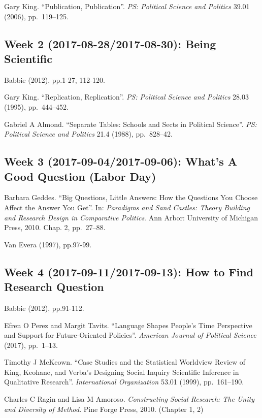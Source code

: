 \documentclass[11pt,]{article}
\theoremstyle{definition}
\theoremstyle{definition}
\theoremstyle{remark}
\begin{document}
Gary King. ``Publication, Publication''.
\emph{PS: Political Science and Politics} 39.01 (2006), pp.~119--125.

\subsection{Week 2 (2017-08-28/2017-08-30): Being
Scientific}\label{week-2-2017-08-282017-08-30-being-scientific}

Babbie (2012), pp.1-27, 112-120.

Gary King. ``Replication, Replication''.
\emph{PS: Political Science and Politics} 28.03 (1995), pp.~444--452.

Gabriel A Almond. ``Separate Tables: Schools and Sects in Political
Science''. \emph{PS: Political Science and Politics} 21.4 (1988),
pp.~828--42.

\subsection{Week 3 (2017-09-04/2017-09-06): What's A Good Question
(Labor
Day)}\label{week-3-2017-09-042017-09-06-whats-a-good-question-labor-day}

Barbara Geddes. ``Big Questions, Little Answers: How the Questions You
Choose Affect the Answer You Get''. In:
\emph{Paradigms and Sand Castles: Theory Building and Research Design in Comparative Politics}.
Ann Arbor: University of Michigan Press, 2010. Chap. 2, pp.~27--88.

Van Evera (1997), pp.97-99.

\subsection{Week 4 (2017-09-11/2017-09-13): How to Find Research
Question}\label{week-4-2017-09-112017-09-13-how-to-find-research-question}

Babbie (2012), pp.91-112.

Efren O Perez and Margit Tavits. ``Language Shapes People's Time
Perspective and Support for Future-Oriented Policies''.
\emph{American Journal of Political Science} (2017), pp.~1--13.

Timothy J McKeown. ``Case Studies and the Statistical Worldview Review
of King, Keohane, and Verba's Designing Social Inquiry Scientific
Inference in Qualitative Research''. \emph{International Organization}
53.01 (1999), pp.~161--190.

Charles C Ragin and Lisa M Amoroso.
\emph{Constructing Social Research: The Unity and Diversity of Method}.
Pine Forge Press, 2010. (Chapter 1, 2)
\end{document}
